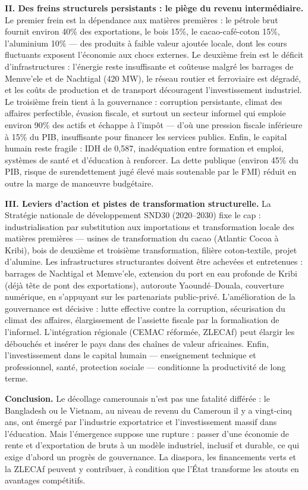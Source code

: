 \documentclass[11pt]{article}
\begin{document}
\begin{corrige}
\textbf{II. Des freins structurels persistants : le piège du revenu intermédiaire.} Le premier frein est la dépendance aux matières premières : le pétrole brut fournit environ 40\% des exportations, le bois 15\%, le cacao-café-coton 15\%, l'aluminium 10\% — des produits à faible valeur ajoutée locale, dont les cours fluctuants exposent l'économie aux chocs externes. Le deuxième frein est le déficit d'infrastructures : l'énergie reste insuffisante et coûteuse malgré les barrages de Memve'ele et de Nachtigal (420 MW), le réseau routier et ferroviaire est dégradé, et les coûts de production et de transport découragent l'investissement industriel. Le troisième frein tient à la gouvernance : corruption persistante, climat des affaires perfectible, évasion fiscale, et surtout un secteur informel qui emploie environ 90\% des actifs et échappe à l'impôt — d'où une pression fiscale inférieure à 15\% du PIB, insuffisante pour financer les services publics. Enfin, le capital humain reste fragile : IDH de 0,587, inadéquation entre formation et emploi, systèmes de santé et d'éducation à renforcer. La dette publique (environ 45\% du PIB, risque de surendettement jugé élevé mais soutenable par le FMI) réduit en outre la marge de manœuvre budgétaire.

\textbf{III. Leviers d'action et pistes de transformation structurelle.} La Stratégie nationale de développement SND30 (2020--2030) fixe le cap : industrialisation par substitution aux importations et transformation locale des matières premières — usines de transformation du cacao (Atlantic Cocoa à Kribi), bois de deuxième et troisième transformation, filière coton-textile, projet d'alumine. Les infrastructures structurantes doivent être achevées et entretenues : barrages de Nachtigal et Memve'ele, extension du port en eau profonde de Kribi (déjà tête de pont des exportations), autoroute Yaoundé--Douala, couverture numérique, en s'appuyant sur les partenariats public-privé. L'amélioration de la gouvernance est décisive : lutte effective contre la corruption, sécurisation du climat des affaires, élargissement de l'assiette fiscale par la formalisation de l'informel. L'intégration régionale (CEMAC réformée, ZLECAf) peut élargir les débouchés et insérer le pays dans des chaînes de valeur africaines. Enfin, l'investissement dans le capital humain — enseignement technique et professionnel, santé, protection sociale — conditionne la productivité de long terme.

\textbf{Conclusion.} Le décollage camerounais n'est pas une fatalité différée : le Bangladesh ou le Vietnam, au niveau de revenu du Cameroun il y a vingt-cinq ans, ont émergé par l'industrie exportatrice et l'investissement massif dans l'éducation. Mais l'émergence suppose une rupture : passer d'une économie de rente et d'exportation de bruts à un modèle industriel, inclusif et durable, ce qui exige d'abord un progrès de gouvernance. La diaspora, les financements verts et la ZLECAf peuvent y contribuer, à condition que l'État transforme les atouts en avantages compétitifs.


\end{corrige}
\end{document}

